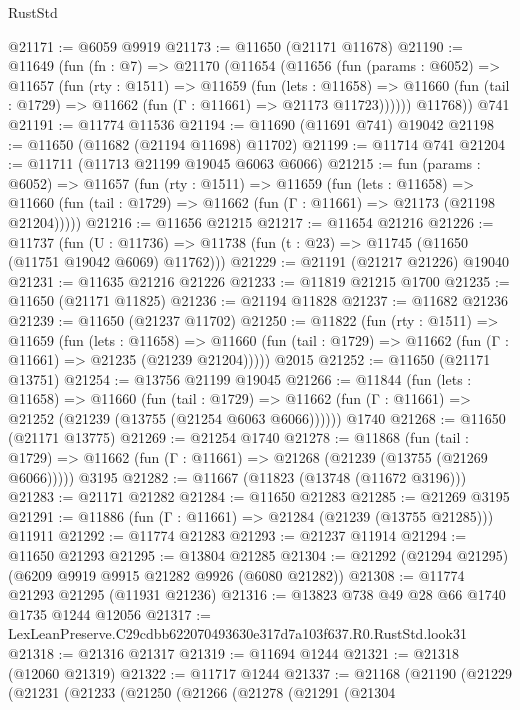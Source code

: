 \begin{lexlean}{RustStd}
\begin{coremodule}
@21171 := @6059 @9919
@21173 := @11650 (@21171 @11678)
@21190 := @11649
    (fun (fn : @7) =>
    @21170
      (@11654
        (@11656
          (fun (params : @6052) =>
          @11657
            (fun (rty : @1511) =>
            @11659
              (fun (lets : @11658) =>
              @11660 (fun (tail : @1729) => @11662 (fun (Γ : @11661) => @21173 @11723))))))
        @11768))
    @741
@21191 := @11774 @11536
@21194 := @11690 (@11691 @741) @19042
@21198 := @11650 (@11682 (@21194 @11698) @11702)
@21199 := @11714 @741
@21204 := @11711 (@11713 @21199 @19045 @6063 @6066)
@21215 := fun (params : @6052) =>
  @11657
    (fun (rty : @1511) =>
    @11659
      (fun (lets : @11658) =>
      @11660 (fun (tail : @1729) => @11662 (fun (Γ : @11661) => @21173 (@21198 @21204)))))
@21216 := @11656 @21215
@21217 := @11654 @21216
@21226 := @11737
    (fun (U : @11736) => @11738 (fun (t : @23) => @11745 (@11650 (@11751 @19042 @6069) @11762)))
@21229 := @21191 (@21217 @21226) @19040
@21231 := @11635 @21216 @21226
@21233 := @11819 @21215 @1700
@21235 := @11650 (@21171 @11825)
@21236 := @21194 @11828
@21237 := @11682 @21236
@21239 := @11650 (@21237 @11702)
@21250 := @11822
    (fun (rty : @1511) =>
    @11659
      (fun (lets : @11658) =>
      @11660 (fun (tail : @1729) => @11662 (fun (Γ : @11661) => @21235 (@21239 @21204)))))
    @2015
@21252 := @11650 (@21171 @13751)
@21254 := @13756 @21199 @19045
@21266 := @11844
    (fun (lets : @11658) =>
    @11660
      (fun (tail : @1729) =>
      @11662 (fun (Γ : @11661) => @21252 (@21239 (@13755 (@21254 @6063 @6066))))))
    @1740
@21268 := @11650 (@21171 @13775)
@21269 := @21254 @1740
@21278 := @11868
    (fun (tail : @1729) => @11662 (fun (Γ : @11661) => @21268 (@21239 (@13755 (@21269 @6066)))))
    @3195
@21282 := @11667 (@11823 (@13748 (@11672 @3196)))
@21283 := @21171 @21282
@21284 := @11650 @21283
@21285 := @21269 @3195
@21291 := @11886 (fun (Γ : @11661) => @21284 (@21239 (@13755 @21285))) @11911
@21292 := @11774 @21283
@21293 := @21237 @11914
@21294 := @11650 @21293
@21295 := @13804 @21285
@21304 := @21292 (@21294 @21295) (@6209 @9919 @9915 @21282 @9926 (@6080 @21282))
@21308 := @11774 @21293 @21295 (@11931 @21236)
@21316 := @13823 @738 @49 @28 @66 @1740 @1735 @1244 @12056
@21317 := LexLeanPreserve.C29cdbb622070493630e317d7a103f637.R0.RustStd.look31
@21318 := @21316 @21317
@21319 := @11694 @1244
@21321 := @21318 (@12060 @21319)
@21322 := @11717 @1244
@21337 := @21168
    (@21190
      (@21229
        (@21231
          (@21233
            (@21250
              (@21266
                (@21278
                  (@21291
                    (@21304

\end{coremodule}
\end{lexlean}

